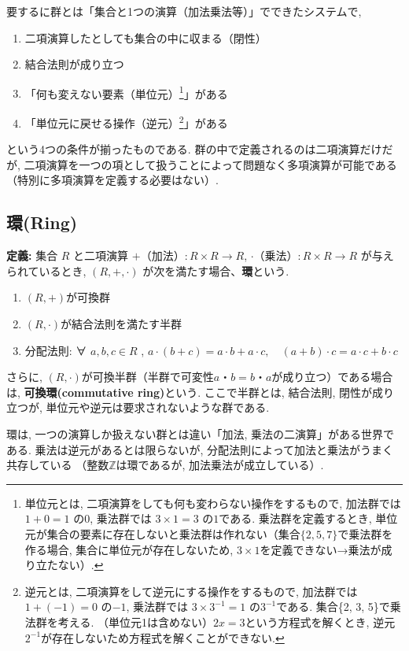 \documentclass{ltjsarticle}
\begin{document}
要するに群とは「集合と1つの演算（加法乗法等）」でできたシステムで, 
\begin{enumerate}
\item 二項演算したとしても集合の中に収まる（閉性）
\item 結合法則が成り立つ
\item「何も変えない要素（単位元）\footnote{
単位元とは, 二項演算をしても何も変わらない操作をするもので, 加法群では $1+0=1$ の$0$, 乗法群では $3\times 1=3$ の$1$である. 
乗法群を定義するとき, 単位元が集合の要素に存在しないと乗法群は作れない（集合$\{2, 5, 7\}$で乗法群を作る場合, 
集合に単位元が存在しないため, $3\times1$を定義できない→乗法が成り立たない）. 
}」がある
\item「単位元に戻せる操作（逆元）\footnote{
逆元とは, 二項演算をして逆元にする操作をするもので, 加法群では $1+(-1)=0$ の$-1$, 乗法群では $3\times3^{-1}=1$ の$3^{-1}$である. 
集合\{2, 3, 5\}で乗法群を考える. （単位元1は含めない）$2x=3$という方程式を解くとき, 逆元$2^{-1}$が存在しないため方程式を解くことができない. 
}」がある
\end{enumerate}
という4つの条件が揃ったものである. 
群の中で定義されるのは二項演算だけだが, 
二項演算を一つの項として扱うことによって問題なく多項演算が可能である（特別に多項演算を定義する必要はない）.

\subsection{環(Ring)}

\textbf{定義:} 集合 $R$ と二項演算 $+（加法）: R \times R \to R$, $\cdot（乗法）: R \times R \to R$ 
が与えられているとき, $(R,+,\cdot)$ が次を満たす場合、\textbf{環}という. 
\begin{enumerate}
    \item $(R,+)$が可換群
    \item $(R,\cdot)$が結合法則を満たす半群
    \item 分配法則: ∀ $a,b,c \in R$ , $a\cdot(b+c) = a\cdot b + a \cdot c, \quad (a+b)\cdot c = a\cdot c + b\cdot c$

\end{enumerate}

さらに, $(R,\cdot)$が可換半群（半群で可変性$a・b=b・a$が成り立つ）である場合は, 
\textbf{可換環(commutative ring)}という. 
ここで半群とは, 結合法則, 閉性が成り立つが, 単位元や逆元は要求されないような群である. 

環は, 一つの演算しか扱えない群とは違い「加法, 乗法の二演算」がある世界である. 
乗法は逆元があるとは限らないが, 分配法則によって加法と乗法がうまく共存している
（整数$\mathbb{Z}$は環であるが, 加法乗法が成立している）. 
\end{document}
